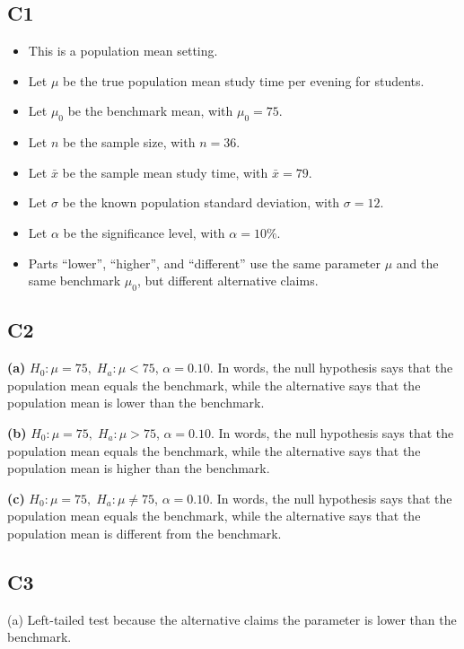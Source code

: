 \begin{ExamProblems}
		\subsection*{C1}
		\begin{itemize}
			\item This is a population mean setting.
			\item Let \(\mu\) be the true population mean study time per evening for students.
			\item Let \(\mu_0\) be the benchmark mean, with \(\mu_0=75\).
			\item Let \(n\) be the sample size, with \(n=36\).
			\item Let \(\bar{x}\) be the sample mean study time, with \(\bar{x}=79\).
			\item Let \(\sigma\) be the known population standard deviation, with \(\sigma=12\).
			\item Let \(\alpha\) be the significance level, with \(\alpha=10\%\).
			\item Parts ``lower'', ``higher'', and ``different'' use the same parameter \(\mu\) and the same benchmark \(\mu_0\), but different alternative claims.
		\end{itemize}
		
		\subsection*{C2}
		\textbf{(a)} \(H_0\colon \mu=75,\; H_a\colon \mu<75\), \(\alpha=0.10\). In words, the null hypothesis says that the population mean equals the benchmark, while the alternative says that the population mean is lower than the benchmark.
		
		\textbf{(b)} \(H_0\colon \mu=75,\; H_a\colon \mu>75\), \(\alpha=0.10\). In words, the null hypothesis says that the population mean equals the benchmark, while the alternative says that the population mean is higher than the benchmark.
		
		\textbf{(c)} \(H_0\colon \mu=75,\; H_a\colon \mu\ne 75\), \(\alpha=0.10\). In words, the null hypothesis says that the population mean equals the benchmark, while the alternative says that the population mean is different from the benchmark.
		
		\subsection*{C3}
		(a) Left-tailed test because the alternative claims the parameter is lower than the benchmark.\LeftTailGraph
		

\end{ExamProblems}
